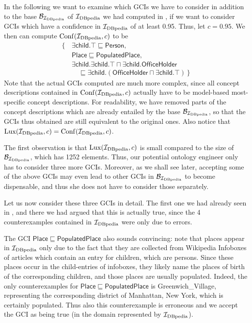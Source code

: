In the following we want to examine which GCIs we have to consider in addition to the base
$\mathcal{B}_{{\mathcal{I}_{\text{DBpedia}}}}$ of ${\mathcal{I}_{\text{DBpedia}}}$ we had computed in
, if we want to consider GCIs which have a confidence in
${\mathcal{I}_{\text{DBpedia}}}$ of at least 0.95.  Thus, let $c = 0.95$.  We then can compute
$\operatorname{Conf}({\mathcal{I}_{\text{DBpedia}}}, c)$ to be
\begin{align*}
  \{\,
  & \mathsf{\exists child. \top} \sqsubseteq \mathsf{Person}, \\
  & \mathsf{Place} \sqsubseteq \mathsf{PopulatedPlace},\\
  & \mathsf{\exists child. \exists child. \top} \sqcap \mathsf{\exists
    child. OfficeHolder} \\
  & \quad \sqsubseteq \mathsf{\exists child. (OfficeHolder \sqcap \exists child. \top)}
  \,\}
\end{align*}
Note that the actual GCIs computed are much more complex, since all concept descriptions
contained in $\operatorname{Conf}({\mathcal{I}_{\text{DBpedia}}}, c)$ actually have to be model-based most-specific concept
descriptions.  For readability, we have removed parts of the concept descriptions which
are already entailed by the base $\mathcal{B}_{\mathcal{I}_{\text{DBpedia}}}$, so that the GCIs thus obtained
are still equivalent to the original ones.  Also notice that $\operatorname{Lux}({\mathcal{I}_{\text{DBpedia}}}, c) =
\operatorname{Conf}({\mathcal{I}_{\text{DBpedia}}}, c)$.

The first observation is that $\operatorname{Lux}({\mathcal{I}_{\text{DBpedia}}}, c)$ is small compared to the size of
$\mathcal{B}_{\mathcal{I}_{\text{DBpedia}}}$, which has 1252 elements.  Thus, our potential ontology engineer
only has to consider three more GCIs.  Moreover, as we shall see later, accepting some of
the above GCIs may even lead to other GCIs in $\mathcal{B}_{\mathcal{I}_{\text{DBpedia}}}$ to become
dispensable, and thus she does not have to consider those separately.

Let us now consider these three GCIs in detail.  The first one we had already seen in
, and there we had argued that this is actually true, since
the 4 counterexamples contained in ${\mathcal{I}_{\text{DBpedia}}}$ were only due to errors.

The GCI $\mathsf{Place} \sqsubseteq \mathsf{PopulatedPlace}$ also sounds convincing: note
that places appear in ${\mathcal{I}_{\text{DBpedia}}}$ only due to the fact that they are collected from
Wikipedia Infoboxes of articles which contain an entry for children, \ie which are
persons.  Since these places occur in the child-entries of infoboxes, they likely name the
places of birth of the corresponding children, and those places are usually populated.
Indeed, the only counterexamples for $\mathsf{Place \sqsubseteq PopulatedPlace}$ is
\textsf{Greenwich\_Village}, representing the corresponding district of Manhattan, New
York, which is certainly populated.  Thus also this counterexample is erroneous and we
accept the GCI as being true (in the domain represented by ${\mathcal{I}_{\text{DBpedia}}}$).

